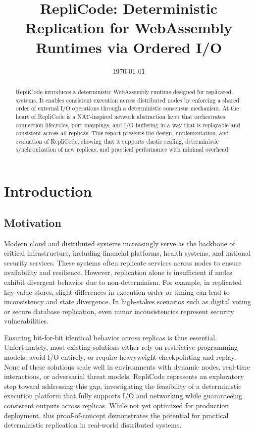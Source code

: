 \documentclass[10pt]{IEEEtran}
\title{RepliCode: Deterministic Replication for WebAssembly Runtimes via Ordered I/O}
\author{
    \IEEEauthorblockN{Ricardo Perelló Mas \\}
    \IEEEauthorblockA{
        Distributed Computing Lab, EPFL \\
        ricardo.perellomas@epfl.ch \\
        Spring 2025
    }
}
\date{\today}
\begin{document}
\maketitle

\begin{abstract}
RepliCode introduces a deterministic WebAssembly runtime designed for replicated systems. It enables consistent execution across distributed nodes by enforcing a shared order of external I/O operations through a deterministic consensus mechanism. At the heart of RepliCode is a NAT-inspired network abstraction layer that orchestrates connection lifecycles, port mappings, and I/O buffering in a way that is replayable and consistent across all replicas. This report presents the design, implementation, and evaluation of RepliCode, showing that it supports elastic scaling, deterministic synchronization of new replicas, and practical performance with minimal overhead.
\end{abstract}

\section{Introduction}

\subsection{Motivation}
Modern cloud and distributed systems increasingly serve as the backbone of critical infrastructure, including financial platforms, health systems, and national security services. These systems often replicate services across nodes to ensure availability and resilience. However, replication alone is insufficient if nodes exhibit divergent behavior due to non-determinism. For example, in replicated key-value stores, slight differences in execution order or timing can lead to inconsistency and state divergence. In high-stakes scenarios such as digital voting or secure database replication, even minor inconsistencies represent security vulnerabilities.

Ensuring bit-for-bit identical behavior across replicas is thus essential. Unfortunately, most existing solutions either rely on restrictive programming models, avoid I/O entirely, or require heavyweight checkpointing and replay. None of these solutions scale well in environments with dynamic nodes, real-time interactions, or adversarial threat models. RepliCode represents an exploratory step toward addressing this gap, investigating the feasibility of a deterministic execution platform that fully supports I/O and networking while guaranteeing consistent outputs across replicas. While not yet optimized for production deployment, this proof-of-concept demonstrates the potential for practical deterministic replication in real-world distributed systems.
\end{document}
